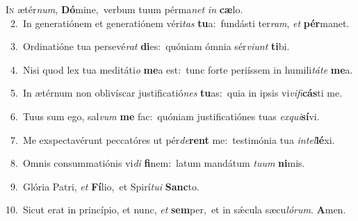 \lettrine{\initial\textcolor{\initialcolor}{I}}{n} ætér\-\textit{num}\-, \textbf{Dó}\-mine,~\star verbum tuum pérma\textit{net} \textit{in} \textbf{cæ}\-lo.\\
{\numbfont\textcolor{\numbcolor}{~2.}}~In generatiónem et generatiónem véri\textit{tas} \textbf{tu}\-a:~\star fundásti ter\-\textit{ram}\-, \textit{et} \textbf{pér}\-manet.\par
{\numbfont\textcolor{\numbcolor}{~3.}}~Ordinatióne tua persevé\textit{rat} \textbf{di}\-es:~\star quóniam ómnia sér\-\textit{vi}\-\textit{unt} \textbf{ti}\-bi.\par
{\numbfont\textcolor{\numbcolor}{~4.}}~Nisi quod lex tua meditáti\textit{o} \textbf{me}\-a est:~\star tunc forte periíssem in humili\-\textit{tá}\-\textit{te} \textbf{me}\-a.\par
{\numbfont\textcolor{\numbcolor}{~5.}}~In ætérnum non oblivíscar justificatió\textit{nes} \textbf{tu}\-as:~\star quia in ipsis vi\-\textit{vi}\-\textit{fi}\textbf{cás}ti me.\par
{\numbfont\textcolor{\numbcolor}{~6.}}~Tuus sum ego, sal\textit{vum} \textbf{me} fac:~\star quóniam justificatiónes tuas \textit{ex}\-\textit{qui}\textbf{sí}vi.\par
{\numbfont\textcolor{\numbcolor}{~7.}}~Me exspectavérunt peccatóres ut pér\-\textit{de}\-\textbf{rent} me:~\star testimónia tua \textit{in}\-\textit{tel}\textbf{lé}xi.\par
{\numbfont\textcolor{\numbcolor}{~8.}}~Omnis consummatiónis vi\textit{di} \textbf{fi}\-nem:~\star latum mandátum \textit{tu}\-\textit{um} \textbf{ni}\-mis.\par
{\numbfont\textcolor{\numbcolor}{~9.}}~Glória Patri, \textit{et} \textbf{Fí}\-lio,~\star et Spirí\-\textit{tu}\-\textit{i} \textbf{Sanc}\-to.\par
{\numbfont\textcolor{\numbcolor}{10.}}~Sicut erat in princípio, et nunc, \textit{et} \textbf{sem}\-per,~\star et in sǽcula sæcu\-\textit{ló}\-\textit{rum}. \textbf{A}\-men.\par
